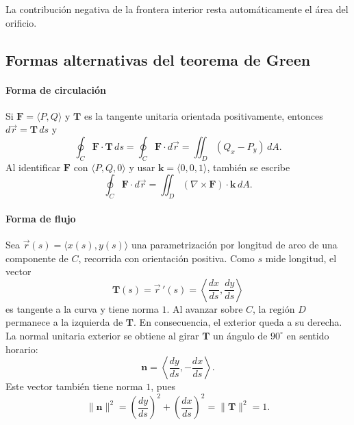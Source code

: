La contribución negativa de la frontera interior resta automáticamente el área del orificio.

\subsection{Formas alternativas del teorema de Green}

\paragraph{Forma de circulación}
Si $\mathbf{F}=\langle P,Q\rangle$ y $\mathbf{T}$ es la tangente unitaria orientada positivamente, entonces $d\vec r=\mathbf{T}\,ds$ y
\[
\oint_C\mathbf{F}\cdot\mathbf{T}\,ds
=\oint_C\mathbf{F}\cdot d\vec r
=\iint_D(Q_x-P_y)\,dA.
\]
Al identificar $\mathbf{F}$ con $\langle P,Q,0\rangle$ y usar $\mathbf{k}=\langle0,0,1\rangle$, también se escribe
\[
\oint_C\mathbf{F}\cdot d\vec r
=\iint_D(\nabla\times\mathbf{F})\cdot\mathbf{k}\,dA.
\]

\paragraph{Forma de flujo}
Sea $\vec r(s)=\langle x(s),y(s)\rangle$ una parametrización por longitud de arco de una componente de $C$, recorrida con orientación positiva. Como $s$ mide longitud, el vector
\[
\mathbf{T}(s)=\vec r\,'(s)
=\left\langle\frac{dx}{ds},\frac{dy}{ds}\right\rangle
\]
es tangente a la curva y tiene norma $1$. Al avanzar sobre $C$, la región $D$ permanece a la izquierda de $\mathbf{T}$. En consecuencia, el exterior queda a su derecha. La normal unitaria exterior se obtiene al girar $\mathbf{T}$ un ángulo de $90^\circ$ en sentido horario:
\[
\mathbf{n}=\left\langle\frac{dy}{ds},-\frac{dx}{ds}\right\rangle.
\]
Este vector también tiene norma $1$, pues
\[
\lVert\mathbf{n}\rVert^2
=\left(\frac{dy}{ds}\right)^2+
  \left(\frac{dx}{ds}\right)^2
=\lVert\mathbf{T}\rVert^2=1.
\]

\begingroup
\shorthandoff{>}
\begin{center}
\end{center}
\endgroup

